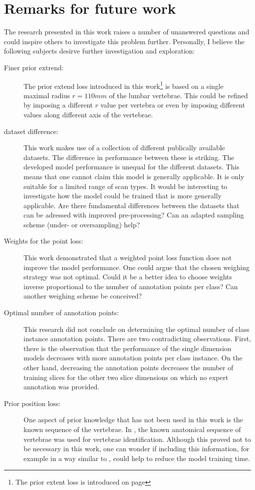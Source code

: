 \chapter{Remarks for future work}
The research presented in this work raises a number of unanswered questions and could inspire others to investigate this problem further.
Personally, I believe the following subjects desirve further investigation and exploration:
\begin{description}
    \item[Finer prior extrend:] The prior extend loss introduced in this work\footnote{The prior extent loss is introduced on page \pageref{fig:prior_extent}} is based on a single maximal radius $r=110mm$ 
    of the lumbar vertebrae. This could be refined by imposing a different $r$ value per vertebra or even by imposing different values along different axis of the vertebrae.
    \item[dataset difference:] This work makes use of a collection of different publically available datasets. The difference in performance between these is striking.
    The developed model performance is unequal for the different datasets. This means that one cannot claim this model is generally applicable. It is only suitable for a limited range of scan types.
    It would be interesting to investigate how the model could be trained that is more generally applicable. Are there fundamental differences between the datasets that can be adressed with improved pre-processing?
    Can an adapted sampling scheme (under- or oversampling) help? 
    \item[Weights for the point loss:] This work demonstrated that a weighted point loss function does not improve the model performance. One could argue that the chosen weighing strategy was not optimal.
    Could it be a better idea to choose weights inverse proportional to the number of annotation points per class? Can another weighing scheme be conceived? 
    \item[Optimal number of annotation points:] This research did not conclude on determining the optimal number of class instance annotation points. There are two contradicting observations.
    First, there is the observation that the performance of the single dimension models decreases with more annotation points per class instance. 
    On the other hand, decreasing the annotation points decreases the number of training slices for the other two slice dimensions on which no expert annotation was provided.
    \item[Prior position loss:] One aspect of prior knowledge that has not been used in this work is the known sequence of the vertebrae. In \cite{Lessmann2018}, 
    the known anatomical sequence of vertebrae was used for vertebrae identification.
    Although this proved not to be necessary in this work, one can wonder if including this information, for example in a way similar to \cite{Lessmann2018}, could help to reduce the model training time.
\end{description}